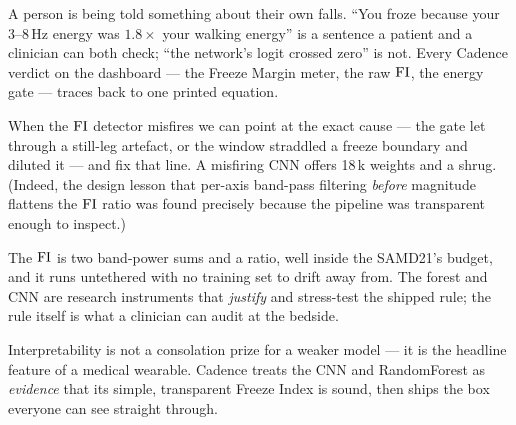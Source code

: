 \begin{description}[leftmargin=1.6em,style=nextline]
\item[Trust.] A person is being told something about their own falls. ``You froze
because your 3--8\,Hz energy was $1.8\times$ your walking energy'' is a sentence a
patient and a clinician can both check; ``the network's logit crossed zero'' is not.
Every Cadence verdict on the dashboard --- the Freeze Margin meter, the raw $\mathrm{FI}$, the
energy gate --- traces back to one printed equation.
\item[Debuggability.] When the $\mathrm{FI}$ detector misfires we can point at the exact cause
--- the gate let through a still-leg artefact, or the window straddled a freeze
boundary and diluted it --- and fix that line. A misfiring CNN offers 18\,k weights and
a shrug. (Indeed, the design lesson that per-axis band-pass filtering \emph{before}
magnitude flattens the $\mathrm{FI}$ ratio was found precisely because the pipeline was
transparent enough to inspect.)
\item[Footprint and honesty.] The $\mathrm{FI}$ is two band-power sums and a ratio, well
inside the SAMD21's budget, and it runs untethered with no training set to drift away
from. The forest and CNN are research instruments that \emph{justify} and stress-test
the shipped rule; the rule itself is what a clinician can audit at the bedside.
\end{description}

\begin{keyidea}
Interpretability is not a consolation prize for a weaker model --- it is the headline
feature of a medical wearable. Cadence treats the CNN and RandomForest as
\emph{evidence} that its simple, transparent Freeze Index is sound, then ships the box
everyone can see straight through.
\end{keyidea}
